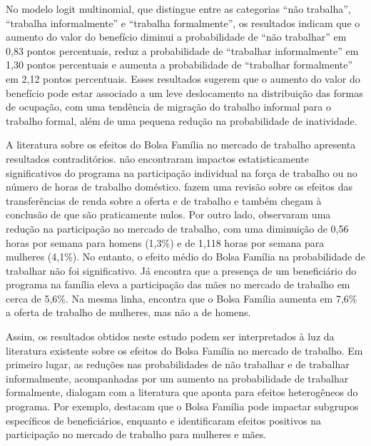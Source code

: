 \documentclass[12pt]{article}
\theoremstyle{break}
\begin{document}
No modelo logit multinomial, que distingue entre as categorias ``não trabalha'', ``trabalha informalmente'' e ``trabalha formalmente'', os resultados indicam que o aumento do valor do benefício diminui a probabilidade de ``não trabalhar'' em 0,83 pontos percentuais, reduz a probabilidade de ``trabalhar informalmente'' em 1,30 pontos percentuais e aumenta a probabilidade de ``trabalhar formalmente'' em 2,12 pontos percentuais. Esses resultados sugerem que o aumento do valor do benefício pode estar associado a um leve deslocamento na distribuição das formas de ocupação, com uma tendência de migração do trabalho informal para o trabalho formal, além de uma pequena redução na probabilidade de inatividade.

A literatura sobre os efeitos do Bolsa Família no mercado de trabalho apresenta resultados contraditórios. \textcite{debrauw2015bolsa} não encontraram impactos estatisticamente significativos do programa na participação individual na força de trabalho ou no número de horas de trabalho doméstico. \textcite{oliveira2012se} fazem uma revisão sobre os efeitos das transferências de renda sobre a oferta e de trabalho e também chegam à conclusão de que são praticamente nulos. Por outro lado, \textcite{teixeira2010heterogeneity} observaram uma redução na participação no mercado de trabalho, com uma diminuição de 0,56 horas por semana para homens (1,3\%) e de 1,118 horas por semana para mulheres (4,1\%). No entanto, o efeito médio do Bolsa Família na probabilidade de trabalhar não foi significativo. Já \textcite{tavares2010efeito} encontra que a presença de um beneficiário do programa na família eleva a participação das mães no mercado de trabalho em cerca de 5,6\%. Na mesma linha, \textcite{mariante2024} encontra que o Bolsa Família aumenta em 7,6\% a oferta de trabalho de mulheres, mas não a de homens. 

Assim, os resultados obtidos neste estudo podem ser interpretados à luz da literatura existente sobre os efeitos do Bolsa Família no mercado de trabalho. Em primeiro lugar, as reduções nas probabilidades de não trabalhar e de trabalhar informalmente, acompanhadas por um aumento na probabilidade de trabalhar formalmente, dialogam com a literatura que aponta para efeitos heterogêneos do programa. Por exemplo, \textcite{teixeira2010heterogeneity} destacam que o Bolsa Família pode impactar subgrupos específicos de beneficiários, enquanto \textcite{tavares2010efeito} e \textcite{mariante2024} identificaram efeitos positivos na participação no mercado de trabalho para mulheres e mães.
\end{document}
